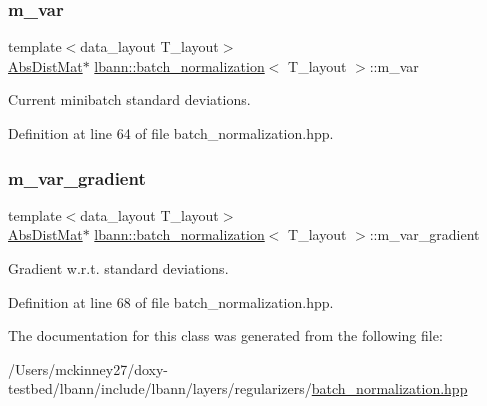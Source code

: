 \subsubsection{\texorpdfstring{m\+\_\+var}{m\_var}}
{\footnotesize\ttfamily template$<$data\+\_\+layout T\+\_\+layout$>$ \\
\hyperlink{base_8hpp_a9a697a504ae84010e7439ffec862b470}{Abs\+Dist\+Mat}$\ast$ \hyperlink{classlbann_1_1batch__normalization}{lbann\+::batch\+\_\+normalization}$<$ T\+\_\+layout $>$\+::m\+\_\+var\hspace{0.3cm}{\ttfamily [private]}}

Current minibatch standard deviations. 

Definition at line 64 of file batch\+\_\+normalization.\+hpp.

\mbox{\label{classlbann_1_1batch__normalization_aa2d2050a265eed854aa8950cd1461af9}} 
\subsubsection{\texorpdfstring{m\+\_\+var\+\_\+gradient}{m\_var\_gradient}}
{\footnotesize\ttfamily template$<$data\+\_\+layout T\+\_\+layout$>$ \\
\hyperlink{base_8hpp_a9a697a504ae84010e7439ffec862b470}{Abs\+Dist\+Mat}$\ast$ \hyperlink{classlbann_1_1batch__normalization}{lbann\+::batch\+\_\+normalization}$<$ T\+\_\+layout $>$\+::m\+\_\+var\+\_\+gradient\hspace{0.3cm}{\ttfamily [private]}}

Gradient w.\+r.\+t. standard deviations. 

Definition at line 68 of file batch\+\_\+normalization.\+hpp.



The documentation for this class was generated from the following file\+:\begin{DoxyCompactItemize}
\item 
/\+Users/mckinney27/doxy-\/testbed/lbann/include/lbann/layers/regularizers/\hyperlink{batch__normalization_8hpp}{batch\+\_\+normalization.\+hpp}\end{DoxyCompactItemize}
